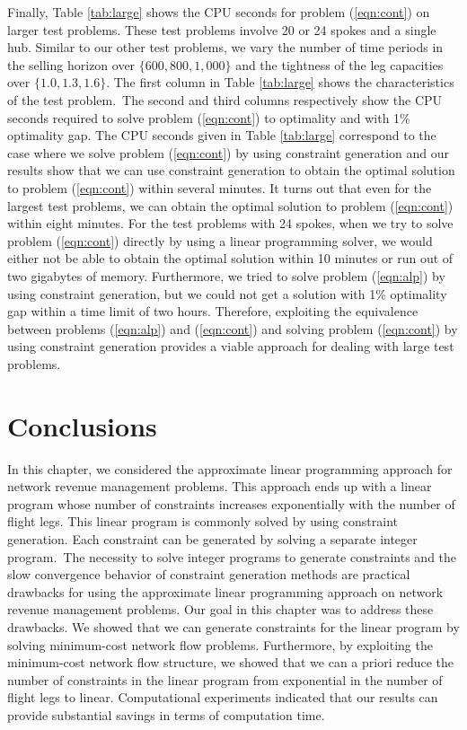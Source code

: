 Finally, Table \ref{tab:large} shows the CPU seconds for problem (\ref{eqn:cont}) on larger test problems. These test problems involve 20 or 24 spokes and a single hub. Similar to our other test problems, we vary the number of time periods in the selling horizon over $\{ 600,800,1\!,\!000\}$ and the tightness of the leg capacities over $\{1.0,1.3,1.6\}$. The first column in Table \ref{tab:large} shows the characteristics of the test problem.~The second and third columns respectively show the  CPU seconds required to solve problem (\ref{eqn:cont}) to optimality and with 1\% optimality gap. The CPU seconds given in Table \ref{tab:large} correspond to the case where we solve problem (\ref{eqn:cont}) by using constraint generation and our results show that we can use constraint generation to obtain the optimal solution to problem (\ref{eqn:cont}) within several minutes. It turns out that even for the largest test problems, we can obtain the optimal solution to problem (\ref{eqn:cont}) within eight minutes. For the test problems with 24 spokes, when we try to solve problem (\ref{eqn:cont}) directly by using a linear programming solver, we would either not be able to obtain the optimal solution within 10 minutes or run out of two gigabytes of memory. Furthermore, we tried to solve problem (\ref{eqn:alp}) by using constraint generation, but we could not get a solution with 1\% optimality gap within a time limit of two hours. Therefore, exploiting the equivalence between problems (\ref{eqn:alp}) and (\ref{eqn:cont}) and solving problem (\ref{eqn:cont}) by using constraint generation provides a viable approach for dealing with large test problems.


\section{Conclusions}
\label{sec:conc}

In this chapter, we considered the approximate linear programming approach for network revenue management problems. This approach ends up with a linear program whose number of constraints increases exponentially with the number of flight legs. This linear program is commonly solved by using constraint generation. Each constraint can be generated by solving a separate integer program.~The necessity to solve integer programs to generate constraints and the slow convergence behavior of constraint generation methods are practical drawbacks for using the approximate linear programming approach on network revenue management problems. Our goal in this chapter was to address these drawbacks. We showed that we can generate constraints for the linear program by solving minimum-cost network flow problems. Furthermore, by exploiting the minimum-cost network flow structure, we showed that we can a priori reduce the number of constraints in the linear program from exponential in the number of flight legs to linear. Computational experiments indicated that our results can provide substantial savings in terms of computation time. 


